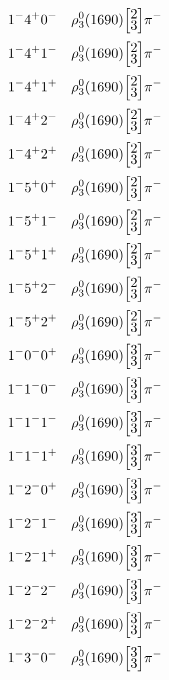 \documentclass[10pt,a4paper]{article}
\def\dst{\displaystyle}
\def\vsp{\hbox{\vrule height12.5pt depth3.5pt width0pt}}
\def\ells#1#2{\Big[\hskip-5pt\vsp\begin{array}{c}\dst#1\\[-4pt]\dst#2\end{array}\vsp\hskip-5pt\Big]}
\begin{document}
\begin{align*} 
 \begin{aligned}
1^{-}4^{+}0^{-}\quad & \rho_3^0(1690)\ells{2}{3}\pi^-\\
1^{-}4^{+}1^{-}\quad & \rho_3^0(1690)\ells{2}{3}\pi^-\\
1^{-}4^{+}1^{+}\quad & \rho_3^0(1690)\ells{2}{3}\pi^-\\
1^{-}4^{+}2^{-}\quad & \rho_3^0(1690)\ells{2}{3}\pi^-\\
1^{-}4^{+}2^{+}\quad & \rho_3^0(1690)\ells{2}{3}\pi^-\\
1^{-}5^{+}0^{+}\quad & \rho_3^0(1690)\ells{2}{3}\pi^-\\
1^{-}5^{+}1^{-}\quad & \rho_3^0(1690)\ells{2}{3}\pi^-\\
1^{-}5^{+}1^{+}\quad & \rho_3^0(1690)\ells{2}{3}\pi^-\\
1^{-}5^{+}2^{-}\quad & \rho_3^0(1690)\ells{2}{3}\pi^-\\
1^{-}5^{+}2^{+}\quad & \rho_3^0(1690)\ells{2}{3}\pi^-\\
1^{-}0^{-}0^{+}\quad & \rho_3^0(1690)\ells{3}{3}\pi^-\\
1^{-}1^{-}0^{-}\quad & \rho_3^0(1690)\ells{3}{3}\pi^-\\
1^{-}1^{-}1^{-}\quad & \rho_3^0(1690)\ells{3}{3}\pi^-\\
1^{-}1^{-}1^{+}\quad & \rho_3^0(1690)\ells{3}{3}\pi^-\\
1^{-}2^{-}0^{+}\quad & \rho_3^0(1690)\ells{3}{3}\pi^-\\
1^{-}2^{-}1^{-}\quad & \rho_3^0(1690)\ells{3}{3}\pi^-\\
1^{-}2^{-}1^{+}\quad & \rho_3^0(1690)\ells{3}{3}\pi^-\\
1^{-}2^{-}2^{-}\quad & \rho_3^0(1690)\ells{3}{3}\pi^-\\
1^{-}2^{-}2^{+}\quad & \rho_3^0(1690)\ells{3}{3}\pi^-\\
1^{-}3^{-}0^{-}\quad & \rho_3^0(1690)\ells{3}{3}\pi^-\\
\end{aligned} 
 \end{align*}\pagebreak
\end{document}
